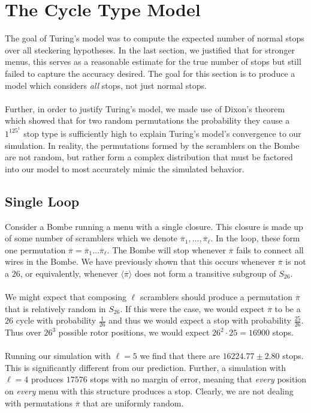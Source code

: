 \section{The Cycle Type Model}
The goal of Turing's model was to compute the expected number of
normal stops over all steckering hypotheses. In the last section, we
justified that for stronger menus, this serves as a reasonable
estimate for the true number of stops but still failed to capture the
accuracy desired. The goal for this section is to produce a model
which considers \emph{all} stops, not just normal stops.
\\\\Further, in order to justify Turing's model, we made use of
Dixon's theorem which showed that for two random permutations the
probability they cause a $1^125^1$ stop type is sufficiently high to
explain Turing's model's convergence to our simulation. In reality,
the permutations formed by the scramblers on the Bombe are not
random, but rather form a complex distribution that must be factored
into our model to most accurately mimic the simulated behavior.
\subsection{Single Loop} Consider a Bombe running a menu with a
single closure. This closure is made up of some number of scramblers
which we denote $\overline\pi_1, \dots, \overline\pi_\ell$. In the
loop, these form one permutation $\overline\pi =
\overline\pi_1\dots\overline\pi_\ell$. The Bombe will stop whenever
$\overline\pi$ fails to connect all wires in the Bombe. We have
previously shown that this occurs whenever $\overline\pi$ is not a
$26$, or equivalently, whenever $\langle\overline\pi\rangle$ does not
form a transitive subgroup of $S_{26}$.
\\\\We might expect that composing $\ell$ scramblers should produce a
permutation $\overline\pi$ that is relatively random in
$S_{26}$. If this were the case, we would expect $\overline\pi$ to be
a $26$ cycle with probability $\frac{1}{26}$ and thus we would expect
a stop with probability $\frac{25}{26}$. Thus over $26^3$ possible
rotor positions, we would expect $26^2\cdot25 = 16900$ stops.
\\\\Running our simulation with $\ell = 5$ we find that there are
$16224.77\pm2.80$ stops. This is significantly different from our
prediction. Further, a simulation with $\ell=4$ produces $17576$
stops with no margin of error, meaning that \emph{every} position on
\emph{every} menu with this structure produces a stop. Clearly, we
are not dealing with permutations $\overline\pi$ that are uniformly random.

